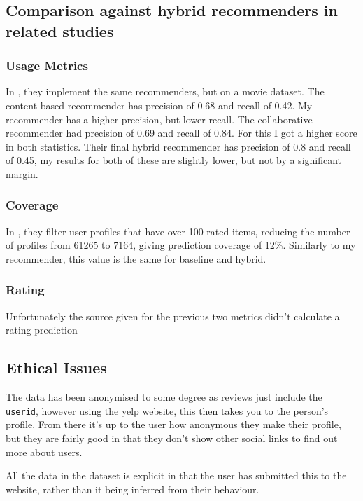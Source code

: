 \documentclass[conference]{IEEEtran}
\begin{document}
\subsection{Comparison against hybrid recommenders in related studies}

\subsubsection{Usage Metrics}

In \cite{evaluation}, they implement the same recommenders, but on a movie dataset. The content based recommender has precision of 0.68 and recall of 0.42. My recommender has a higher precision, but lower recall. The collaborative recommender had precision of 0.69 and recall of 0.84. For this I got a higher score in both statistics. Their final hybrid recommender has precision of 0.8 and recall of 0.45, my results for both of these are slightly lower, but not by a significant margin.

\subsubsection{Coverage}

In \cite{evaluation}, they filter user profiles that have over 100 rated items, reducing the number of profiles from 61265 to 7164, giving prediction coverage of 12\%. Similarly to my recommender, this value is the same for baseline and hybrid.

\subsubsection{Rating}

Unfortunately the source given for the previous two metrics didn't calculate a rating prediction

\subsection{Ethical Issues}

The data has been anonymised to some degree as reviews just include the \texttt{userid}, however using the yelp website, this then takes you to the person's profile. From there it's up to the user how anonymous they make their profile, but they are fairly good in that they don't show other social links to find out more about users.

All the data in the dataset is explicit in that the user has submitted this to the website, rather than it being inferred from their behaviour.
\end{document}
